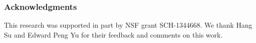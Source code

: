 \documentclass[10pt]{article}
\begin{document}
\subsubsection*{Acknowledgments}
This research was supported in part by NSF grant SCH-1344668. We thank Hang Su and Edward Peng Yu for their feedback and comments on this work.




\end{document}
